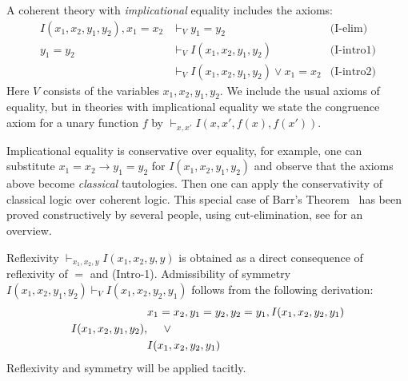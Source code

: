 \documentclass{fundam}
\begin{document}
\begin{definition}\label{def:implicational_equality}
A coherent theory with \emph{implicational} equality includes the axioms:
\begin{align*}
 I(x_1,x_2,y_1,y_2), x_1=x_2 & \vdash_V                 y_1=y_2  &\text{(I-elim)}\\
 y_1=y_2                                  &\vdash_V                 I(x_1,x_2,y_1,y_2)&\text{(I-intro1)}\\ 
                                                 &\vdash_V                 I(x_1,x_2,y_1,y_2) \lor x_1= x_2&\text{(I-intro2)}
\end{align*}
Here $V$ consists of  the variables $x_1,x_2,y_1,y_2$.
We include the usual axioms of equality, but
in theories with implicational equality we state the congruence axiom for 
a unary function $f$ by $\vdash_{x,x'} I(x,x',f(x),f(x'))$.
\end{definition}

Implicational equality is conservative over equality, for example,
one can substitute $x_1=x_2 \to y_1=y_2$
for $I(x_1,x_2,y_1,y_2)$ and observe that the axioms above become
\emph{classical} tautologies. Then one can apply the conservativity of 
classical logic over coherent logic. 
This special case of Barr's Theorem~\cite{Barr} has been proved
constructively by several people, using cut-elimination,
see \cite[Sec. 6]{Negri03} for an overview.

\begin{example}\label{exa:reflsymm}
Reflexivity $\vdash_{x_1,x_2,y} I(x_1,x_2,y,y)$ is obtained as a direct 
consequence of reflexivity of $=$ and (Intro-1).
Admissibility of symmetry  $I(x_1,x_2,y_1,y_2) \vdash_V  I(x_1,x_2,y_2,y_1)$ 
follows from the following derivation:
\begin{align*}
& x_1=x_2, y_1=y_2,y_2=y_1,I(x_1,x_2,y_2,y_1)\\
I(x_1,x_2,y_1,y_2),&{\hphantom w}{\hphantom w}\lor\\
&I(x_1,x_2,y_2,y_1) \\
\end{align*}
Reflexivity and symmetry will be applied tacitly.
\end{example}
\end{document}
